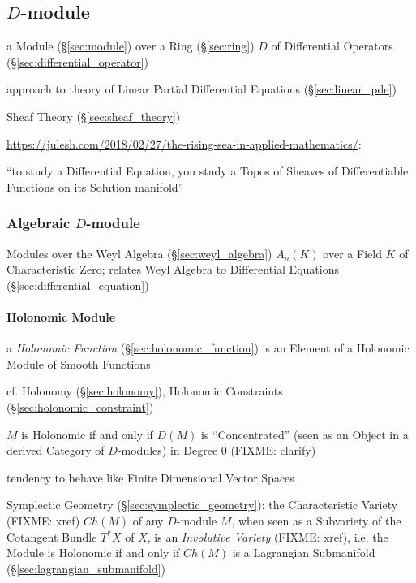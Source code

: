 \subsection{$D$-module}\label{sec:d_module}

a Module (\S\ref{sec:module}) over a Ring (\S\ref{sec:ring}) $D$ of Differential
Operators (\S\ref{sec:differential_operator})

approach to theory of Linear Partial Differential Equations
(\S\ref{sec:linear_pde})

Sheaf Theory (\S\ref{sec:sheaf_theory})

\url{https://julesh.com/2018/02/27/the-rising-sea-in-applied-mathematics/}:

``to study a Differential Equation, you study a Topos of Sheaves of
Differentiable Functions on its Solution manifold''



\subsubsection{Algebraic $D$-module}\label{sec:algebraic_d_module}

Modules over the Weyl Algebra (\S\ref{sec:weyl_algebra}) $A_n(K)$ over a Field
$K$ of Characteristic Zero; relates Weyl Algebra to Differential Equations
(\S\ref{sec:differential_equation})



\paragraph{Holonomic Module}\label{sec:holonomic_module}\hfill

a \emph{Holonomic Function} (\S\ref{sec:holonomic_function}) is an Element of a
Holonomic Module of Smooth Functions

\fist cf. Holonomy (\S\ref{sec:holonomy}), Holonomic Constraints
(\S\ref{sec:holonomic_constraint})

$M$ is Holonomic if and only if $D(M)$ is ``Concentrated'' (seen as an Object
in a derived Category of $D$-modules) in Degree $0$ (FIXME: clarify)

tendency to behave like Finite Dimensional Vector Spaces

\fist Symplectic Geometry (\S\ref{sec:symplectic_geometry}): the Characteristic
Variety (FIXME: xref) $Ch(M)$ of any $D$-module $M$, when seen as a Subvariety
of the Cotangent Bundle $T^*X$ of $X$, is an \emph{Involutive Variety} (FIXME:
xref), i.e. the Module is Holonomic if and only if $Ch(M)$ is a Lagrangian
Submanifold (\S\ref{sec:lagrangian_submanifold})



